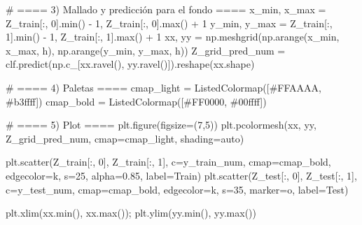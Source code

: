 \documentclass[
  letterpaper,
  DIV=11,
  numbers=noendperiod]{scrartcl}
\newenvironment{Shaded}{\begin{snugshade}}{\end{snugshade}}
\newcommand{\BuiltInTok}[1]{\textcolor[rgb]{0.00,0.23,0.31}{#1}}
\newcommand{\CommentTok}[1]{\textcolor[rgb]{0.37,0.37,0.37}{#1}}
\newcommand{\DecValTok}[1]{\textcolor[rgb]{0.68,0.00,0.00}{#1}}
\newcommand{\FloatTok}[1]{\textcolor[rgb]{0.68,0.00,0.00}{#1}}
\newcommand{\NormalTok}[1]{\textcolor[rgb]{0.00,0.23,0.31}{#1}}
\newcommand{\OperatorTok}[1]{\textcolor[rgb]{0.37,0.37,0.37}{#1}}
\newcommand{\StringTok}[1]{\textcolor[rgb]{0.13,0.47,0.30}{#1}}
\begin{document}
\begin{Shaded}
\begin{Highlighting}[]
\CommentTok{\# ==== 3) Mallado y predicción para el fondo ====}
\NormalTok{x\_min, x\_max }\OperatorTok{=}\NormalTok{ Z\_train[:, }\DecValTok{0}\NormalTok{].}\BuiltInTok{min}\NormalTok{() }\OperatorTok{{-}} \DecValTok{1}\NormalTok{, Z\_train[:, }\DecValTok{0}\NormalTok{].}\BuiltInTok{max}\NormalTok{() }\OperatorTok{+} \DecValTok{1}
\NormalTok{y\_min, y\_max }\OperatorTok{=}\NormalTok{ Z\_train[:, }\DecValTok{1}\NormalTok{].}\BuiltInTok{min}\NormalTok{() }\OperatorTok{{-}} \DecValTok{1}\NormalTok{, Z\_train[:, }\DecValTok{1}\NormalTok{].}\BuiltInTok{max}\NormalTok{() }\OperatorTok{+} \DecValTok{1}
\NormalTok{xx, yy }\OperatorTok{=}\NormalTok{ np.meshgrid(np.arange(x\_min, x\_max, h),}
\NormalTok{                     np.arange(y\_min, y\_max, h))}
\NormalTok{Z\_grid\_pred\_num }\OperatorTok{=}\NormalTok{ clf.predict(np.c\_[xx.ravel(), yy.ravel()]).reshape(xx.shape)}

\CommentTok{\# ==== 4) Paletas ====}
\NormalTok{cmap\_light }\OperatorTok{=}\NormalTok{ ListedColormap([}\StringTok{\textquotesingle{}\#FFAAAA\textquotesingle{}}\NormalTok{, }\StringTok{\textquotesingle{}\#b3ffff\textquotesingle{}}\NormalTok{])}
\NormalTok{cmap\_bold  }\OperatorTok{=}\NormalTok{ ListedColormap([}\StringTok{\textquotesingle{}\#FF0000\textquotesingle{}}\NormalTok{,  }\StringTok{\textquotesingle{}\#00ffff\textquotesingle{}}\NormalTok{])}

\CommentTok{\# ==== 5) Plot ====}
\NormalTok{plt.figure(figsize}\OperatorTok{=}\NormalTok{(}\DecValTok{7}\NormalTok{,}\DecValTok{5}\NormalTok{))}
\NormalTok{plt.pcolormesh(xx, yy, Z\_grid\_pred\_num, cmap}\OperatorTok{=}\NormalTok{cmap\_light, shading}\OperatorTok{=}\StringTok{\textquotesingle{}auto\textquotesingle{}}\NormalTok{)}

\NormalTok{plt.scatter(Z\_train[:, }\DecValTok{0}\NormalTok{], Z\_train[:, }\DecValTok{1}\NormalTok{], c}\OperatorTok{=}\NormalTok{y\_train\_num, cmap}\OperatorTok{=}\NormalTok{cmap\_bold,}
\NormalTok{            edgecolor}\OperatorTok{=}\StringTok{\textquotesingle{}k\textquotesingle{}}\NormalTok{, s}\OperatorTok{=}\DecValTok{25}\NormalTok{, alpha}\OperatorTok{=}\FloatTok{0.85}\NormalTok{, label}\OperatorTok{=}\StringTok{\textquotesingle{}Train\textquotesingle{}}\NormalTok{)}
\NormalTok{plt.scatter(Z\_test[:, }\DecValTok{0}\NormalTok{],  Z\_test[:, }\DecValTok{1}\NormalTok{],  c}\OperatorTok{=}\NormalTok{y\_test\_num,  cmap}\OperatorTok{=}\NormalTok{cmap\_bold,}
\NormalTok{            edgecolor}\OperatorTok{=}\StringTok{\textquotesingle{}k\textquotesingle{}}\NormalTok{, s}\OperatorTok{=}\DecValTok{35}\NormalTok{, marker}\OperatorTok{=}\StringTok{\textquotesingle{}o\textquotesingle{}}\NormalTok{, label}\OperatorTok{=}\StringTok{\textquotesingle{}Test\textquotesingle{}}\NormalTok{)}

\NormalTok{plt.xlim(xx.}\BuiltInTok{min}\NormalTok{(), xx.}\BuiltInTok{max}\NormalTok{())}\OperatorTok{;}\NormalTok{ plt.ylim(yy.}\BuiltInTok{min}\NormalTok{(), yy.}\BuiltInTok{max}\NormalTok{())}
\end{Highlighting}
\end{Shaded}
\end{document}

